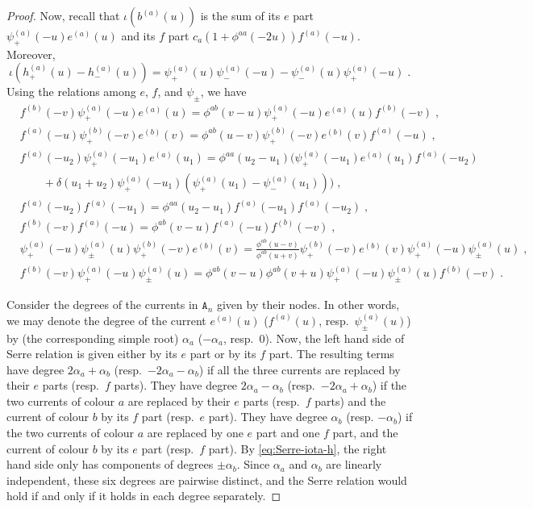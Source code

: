 \documentclass[11pt]{article}
\numberwithin{equation}{section}
\numberwithin{figure}{section}
\numberwithin{table}{section}
\begin{document}
\begin{proof}
    Now, recall that $\iota\left(b^{(a)}(u)\right)$ is the sum of its $e$ part $\psi^{(a)}_+(-u)e^{(a)}(u)$ and its $f$ part $c_a\left(1+\phi^{aa}(-2u)\right)f^{(a)}(-u)$. Moreover,
	\begin{equation}
		\iota\left(h^{(a)}_+(u)-h^{(a)}_-(u)\right)=\psi^{(a)}_+(u)\psi^{(a)}_-(-u)-\psi^{(a)}_-(u)\psi^{(a)}_+(-u)\;.\label{eq:Serre-iota-h}
	\end{equation}
	Using the relations among $e$, $f$, and $\psi_\pm$, we have
	\begin{subequations}
		\begin{align}
			&f^{(b)}(-v)\psi^{(a)}_+(-u)e^{(a)}(u)=\phi^{ab}(v-u)\psi^{(a)}_+(-u)e^{(a)}(u)f^{(b)}(-v)\;,\nonumber\\
			&f^{(a)}(-u)\psi^{(b)}_+(-v)e^{(b)}(v)=\phi^{ab}(u-v)\psi^{(b)}_+(-v)e^{(b)}(v)f^{(a)}(-u)\;,\label{eq:Serre-ex1}\\
			&f^{(a)}(-u_2)\psi^{(a)}_+(-u_1)e^{(a)}(u_1)=\phi^{aa}(u_2-u_1)\Big(\psi^{(a)}_+(-u_1)e^{(a)}(u_1)f^{(a)}(-u_2)\nonumber\\
			&\qquad+\delta(u_1+u_2)\psi^{(a)}_+(-u_1)\left(\psi^{(a)}_+(u_1)-\psi^{(a)}_-(u_1)\right)\Big)\;,\label{eq:Serre-ex2}\\
			&f^{(a)}(-u_2)f^{(a)}(-u_1)=\phi^{aa}(u_2-u_1)f^{(a)}(-u_1)f^{(a)}(-u_2)\;,\label{eq:Serre-ex3a}\\
			&f^{(b)}(-v)f^{(a)}(-u)=\phi^{ab}(v-u)f^{(a)}(-u)f^{(b)}(-v)\;,\label{eq:Serre-ex3b}\\
			&\psi^{(a)}_+(-u)\psi^{(a)}_{\pm}(u)\psi^{(b)}_+(-v)e^{(b)}(v)=\frac{\phi^{ab}(u-v)}{\phi^{ab}(u+v)}\psi^{(b)}_+(-v)e^{(b)}(v)\psi^{(a)}_+(-u)\psi^{(a)}_{\pm}(u)\;,\nonumber\\
			&f^{(b)}(-v)\psi^{(a)}_+(-u)\psi^{(a)}_{\pm}(u)=\phi^{ab}(v-u)\phi^{ab}(v+u)\psi^{(a)}_+(-u)\psi^{(a)}_{\pm}(u)f^{(b)}(-v)\;.\label{eq:Serre-ex4}
		\end{align}
	\end{subequations}

	Consider the degrees of the currents in $\mathtt{A}_n$ given by their nodes. In other words, we may denote the degree of the current $e^{(a)}(u)$ ($f^{(a)}(u)$, resp.~$\psi_\pm^{(a)}(u)$) by (the corresponding simple root) $\alpha_a$ ($-\alpha_a$, resp.~$0$). Now, the left hand side of Serre relation is given either by its $e$ part or by its $f$ part. The resulting terms have degree $2\alpha_a+\alpha_b$ (resp.~$-2\alpha_a-\alpha_b$) if all the three currents are replaced by their $e$ parts (resp.~$f$ parts). They have degree $2\alpha_a-\alpha_b$ (resp.~$-2\alpha_a+\alpha_b$) if the two currents of colour $a$ are replaced by their $e$ parts (resp.~$f$ parts) and the current of colour $b$ by its $f$ part (resp.~$e$ part). They have degree $\alpha_b$ (resp. $-\alpha_b$) if the two currents of colour $a$ are replaced by one $e$ part and one $f$ part, and the current of colour $b$ by its $e$ part (resp.~$f$ part). By \eqref{eq:Serre-iota-h}, the right hand side only has components of degrees $\pm\alpha_b$. Since $\alpha_a$ and $\alpha_b$ are linearly independent, these six degrees are pairwise distinct, and the Serre relation would hold if and only if it holds in each degree separately.


\end{proof}
\end{document}
